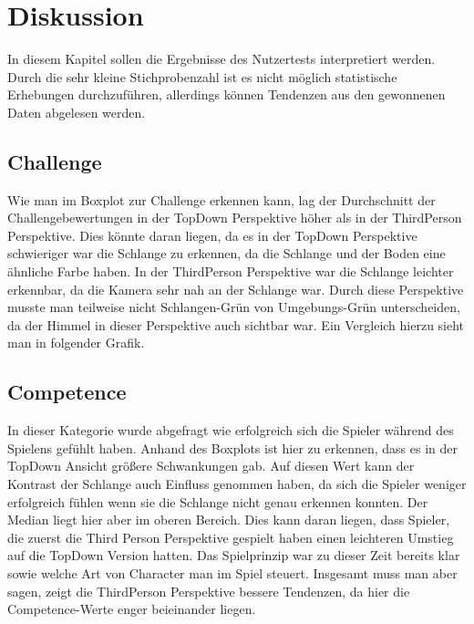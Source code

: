 
\chapter{Diskussion} %
In diesem Kapitel sollen die Ergebnisse des Nutzertests interpretiert werden. Durch die sehr kleine Stichprobenzahl ist es nicht möglich statistische Erhebungen durchzuführen, allerdings können Tendenzen aus den gewonnenen Daten abgelesen werden. 
\section{Challenge}
Wie man im Boxplot zur Challenge erkennen kann, lag der Durchschnitt der Challengebewertungen in der TopDown Perspektive höher als in der ThirdPerson Perspektive. Dies könnte daran liegen, da es in der TopDown Perspektive schwieriger war die Schlange zu erkennen, da die Schlange und der Boden eine ähnliche Farbe haben. In der ThirdPerson Perspektive war die Schlange leichter erkennbar, da die Kamera sehr nah an der Schlange war. Durch diese Perspektive musste man teilweise nicht Schlangen-Grün von Umgebungs-Grün unterscheiden, da der Himmel in dieser Perspektive auch sichtbar war. Ein Vergleich hierzu sieht man in folgender Grafik.


\section{Competence}
In dieser Kategorie wurde abgefragt wie erfolgreich sich die Spieler während des Spielens gefühlt haben. Anhand des Boxplots ist hier zu erkennen, dass es in der TopDown Ansicht größere Schwankungen gab. Auf diesen Wert kann der Kontrast der Schlange auch Einfluss genommen haben, da sich die Spieler weniger erfolgreich fühlen wenn sie die Schlange nicht genau erkennen konnten. Der Median liegt hier aber im oberen Bereich. Dies kann daran liegen, dass Spieler, die zuerst die Third Person Perspektive gespielt haben einen leichteren Umstieg auf die TopDown Version hatten. Das Spielprinzip war zu dieser Zeit bereits klar sowie welche Art von Character man im Spiel steuert. Insgesamt muss man aber sagen, zeigt die ThirdPerson Perspektive bessere Tendenzen, da hier die Competence-Werte enger beieinander liegen.
